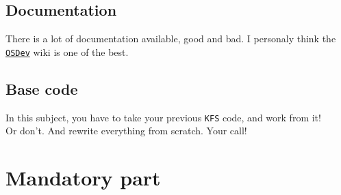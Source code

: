 \documentclass{42-en}
\begin{document}
    \section{Documentation}
        There is a lot of documentation available, good and bad.
        I personaly think the \texttt{\href{http://wiki.osdev.org/Main_Page}
        {OSDev}} wiki is one of the best.
    \section{Base code}
        In this subject, you have to take your previous \texttt{KFS} code,
        and work from it!\\
        Or don't. And rewrite everything from scratch. Your call!
\newpage

\chapter{Mandatory part}
\end{document}
